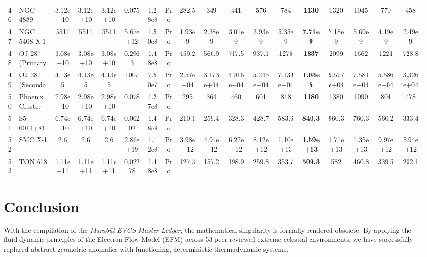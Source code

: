 \documentclass[11pt, a4paper]{article}
\begin{document}
\begin{landscape}
\begin{table}[htbp]
{\begin{tabular}{c l c c c c c c c c c c c c c c c c}
        46 & NGC 4889 & 3.12e+10 & 3.12e+10 & 3.12e+10 & 0.075 & 1.28e8 & Pro & 282.5 & 349 & 441 & 576 & 784 & \textbf{1130} & 1320 & 1045 & 770 & 458 \\
        47 & NGC 5408 X-1 & 5511 & 5511 & 5511 & 5.67e+12 & 1.50e8 & Pro & 1.93e9 & 2.38e9 & 3.01e9 & 3.93e9 & 5.35e9 & \textbf{7.71e9} & 7.18e9 & 5.69e9 & 4.19e9 & 2.49e9 \\
        48 & OJ 287 (Primary & 3.08e+10 & 3.08e+10 & 3.08e+10 & 0.2963 & 1.48e8 & Pro & 459.2 & 566.9 & 717.5 & 937.1 & 1276 & \textbf{1837} & 2099 & 1662 & 1224 & 728.8 \\
        49 & OJ 287 (Seconda & 4.13e5 & 4.13e5 & 4.13e5 & 1007 & 7.50e7 & Pro & 2.57e+04 & 3.173e+04 & 4.016e+04 & 5.245e+04 & 7.139e+04 & \textbf{1.03e5} & 9.577e+04 & 7.581e+04 & 5.586e+04 & 3.326e+04 \\
        50 & Phoenix Cluster & 2.98e+10 & 2.98e+10 & 2.98e+10 & 0.078 & 1.27e8 & Pro & 295 & 364 & 460 & 601 & 818 & \textbf{1180} & 1380 & 1090 & 804 & 478 \\
        51 & S5 0014+81 & 6.74e+10 & 6.74e+10 & 6.74e+10 & 0.06202 & 1.48e8 & Pro & 210.1 & 259.4 & 328.3 & 428.7 & 583.6 & \textbf{840.3} & 960.3 & 760.3 & 560.2 & 333.4 \\
        52 & SMC X-1 & 2.6 & 2.6 & 2.6 & 2.86e+19 & 1.12e8 & Pro & 3.98e+12 & 4.91e+12 & 6.22e+12 & 8.12e+12 & 1.10e+13 & \textbf{1.59e+13} & 1.71e+13 & 1.35e+13 & 9.97e+12 & 5.94e+12 \\
        53 & TON 618 & 1.11e+11 & 1.11e+11 & 1.11e+11 & 0.02278 & 1.48e8 & Pro & 127.3 & 157.2 & 198.9 & 259.8 & 353.7 & \textbf{509.3} & 582 & 460.8 & 339.5 & 202.1 \\
        \bottomrule
      \end{tabular}%
    }
  \end{table}
\end{landscape}

\clearpage
\section{Conclusion}

With the compilation of the \textit{Marab\={u}t EVGS Master Ledger}, the mathematical singularity is formally rendered obsolete. By applying the fluid-dynamic principles of the Electron Flow Model (EFM) across 53 peer-reviewed extreme celestial environments, we have successfully replaced abstract geometric anomalies with functioning, deterministic thermodynamic systems. 
\end{document}
